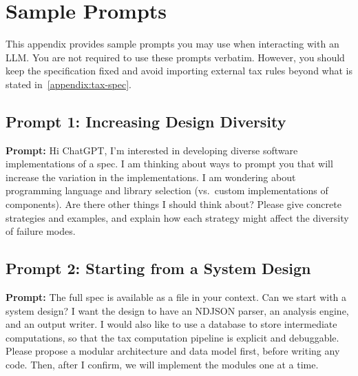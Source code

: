 \section{Sample Prompts}
\label{appendix:sample-prompts}

This appendix provides sample prompts you may use when interacting with an LLM.
You are not required to use these prompts verbatim.
However, you should keep the specification fixed and avoid importing external tax rules beyond what is stated in~\cref{appendix:tax-spec}.

\subsection{Prompt 1: Increasing Design Diversity}
\label{appendix:prompt-diversity}

\begin{tcolorbox}[colback=purple!10,colframe=purple!70!black,boxrule=0.5pt]
\textbf{Prompt:} Hi ChatGPT, I'm interested in developing diverse software implementations of a spec.
I am thinking about ways to prompt you that will increase the variation in the implementations.
I am wondering about programming language and library selection (vs.\ custom implementations of components).
Are there other things I should think about?
Please give concrete strategies and examples, and explain how each strategy might affect the diversity of failure modes.
\end{tcolorbox}

\subsection{Prompt 2: Starting from a System Design}
\label{appendix:prompt-system-design}

\begin{tcolorbox}[colback=purple!10,colframe=purple!70!black,boxrule=0.5pt]
\textbf{Prompt:} The full spec is available as a file in your context.
Can we start with a system design?
I want the design to have an NDJSON parser, an analysis engine, and an output writer.
I would also like to use a database to store intermediate computations, so that the tax computation pipeline is explicit and debuggable.
Please propose a modular architecture and data model first, before writing any code.
Then, after I confirm, we will implement the modules one at a time.
\end{tcolorbox}